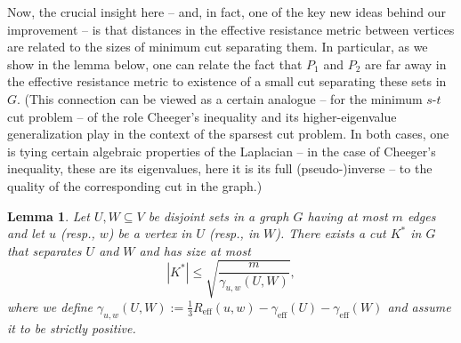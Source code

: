 \documentclass[11pt, letterpaper]{article}
\newtheorem{lemma}[theorem]{Lemma}
\newcommand{\Reff}{R_{\mathrm{eff}}}
\newcommand{\diameff}{\gamma_{\mathrm{eff}}}
\newcommand{\cut}{{K}}
\begin{document}
Now, the crucial insight here -- and, in fact, one of the key new ideas behind our improvement -- is that distances in the effective resistance metric between vertices are related to the sizes of minimum cut separating them. In particular, as we show in the lemma below, one can relate the fact that $P_1$ and $P_2$ are far away in the effective resistance metric to existence of a small cut separating these sets in $G$. (This connection can be viewed as a certain analogue -- for the minimum $s$-$t$ cut problem -- of the role Cheeger's inequality \cite{AlonM85,Alon86} and its higher-eigenvalue generalization \cite{KwokLLOT13} play in the context of the sparsest cut problem. In both cases, one is tying certain algebraic properties of the Laplacian -- in the case of Cheeger's inequality, these are its eigenvalues, here it is its full (pseudo-)inverse -- to the quality of the corresponding cut in the graph.)


\begin{lemma} \label{lem:good_cut}
Let $U, W \subseteq V$ be disjoint sets in a graph $G$ having at most $m$ edges and let $u$ (resp., $w$) be a vertex in $U$ (resp., in $W$). There exists a cut $\cut^*$ in $G$ that separates $U$ and $W$ and has size at most
\[
|\cut^*| \leq \sqrt{\frac{m}{\gamma_{u,w}(U,W)}},
\] 
where we define $\gamma_{u,w}(U,W):=\frac 13 \Reff(u,w) - \diameff(U) - \diameff(W)$ and assume it to be strictly positive.
\end{lemma}
\end{document}
